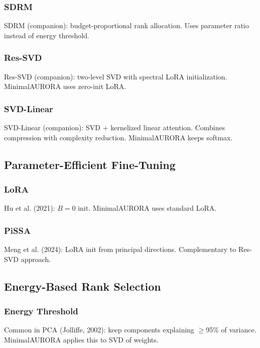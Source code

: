 \subsubsection{SDRM}

SDRM (companion): budget-proportional rank allocation. Uses parameter 
ratio instead of energy threshold.

\subsubsection{Res-SVD}

Res-SVD (companion): two-level SVD with spectral LoRA initialization. 
MinimalAURORA uses zero-init LoRA.

\subsubsection{SVD-Linear}

SVD-Linear (companion): SVD + kernelized linear attention. Combines 
compression with complexity reduction. MinimalAURORA keeps softmax.

\subsection{Parameter-Efficient Fine-Tuning}

\subsubsection{LoRA}

Hu et al. (2021): $B = 0$ init. MinimalAURORA uses standard LoRA.

\subsubsection{PiSSA}

Meng et al. (2024): LoRA init from principal directions. Complementary 
to Res-SVD approach.

\subsection{Energy-Based Rank Selection}

\subsubsection{Energy Threshold}

Common in PCA (Jolliffe, 2002): keep components explaining $\ge$95\% of 
variance. MinimalAURORA applies this to SVD of weights.

